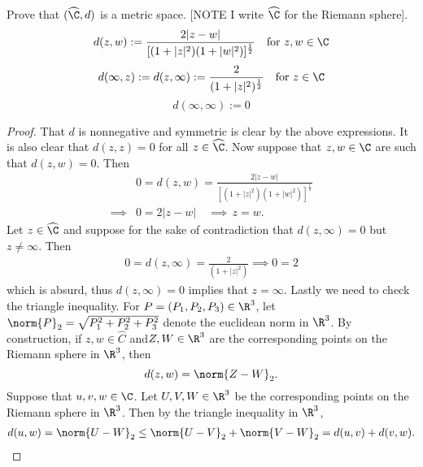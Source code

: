 \documentclass[12pt]{article}
\begin{document}
\begin{homeworkProblem}
Prove that $ (\widehat{\C},d) $ is a metric space. [NOTE I write $ \widehat{\C} $ for the Riemann sphere].\\

\[
  d(z,w) := \frac{2|z-w|}{[(1+|z|^{2})(1+|w|^{2})]^{\frac{1}{2}}}\quad \text{for }z,w\in\C
\]
\[
  d(\infty,z):= d(z,\infty) := \frac{2}{(1+|z|^{2})^{\frac{1}{2}}}\quad \text{for }z\in\C
\]
\[d(\infty,\infty):=0\]
\begin{proof}
 That $ d $ is nonnegative and symmetric is clear by the above expressions. It is also clear that $ d(z,z)= 0  $ for all $ z\in \widehat{\C} $. Now suppose that $ z,w\in \C $ are such that $ d(z,w)=0 $. Then 
 \begin{align*}
   &0 = d(z,w) = \frac{2|z-w|}{[(1+|z|^{2})(1+|w|^{2})]^{\frac{1}{2}}}  \\
   \implies& 0= 2|z-w|\quad \implies\,  z=w.
 \end{align*}
  Let $ z\in \widehat{\C} $ and suppose for the sake of contradiction that $ d(z,\infty)=0 $ but $ z \neq \infty $. Then
  \begin{align*}
    0=d(z,\infty) = \frac{2}{(1+|z|^{2})} \implies  0 = 2
  \end{align*}
  which is absurd, thus $ d(z,\infty)=0 $ implies that $ z=\infty $.
  Lastly we need to check the triangle inequality.  For $ P=(P_{1},P_{2},P_{3})\in\R^{3} $, let $ \norm{P}_{2}= \sqrt{P_{1}^{2}+P_{2}^{2}+P_{3}^{2}} $ denote the euclidean norm in $ \R^{3} $. By construction, if $ z,w\in \widehat{C} $ and$ Z,W\in\R^{3} $ are the corresponding points on the Riemann sphere in $ \R^{3} $, then 
  \[
    d(z,w) = \norm{Z-W}_{2}.
  \]
  Suppose that $ u,v,w\in\C $. Let $ U,V,W\in \R^{3}$ be the corresponding points on the Riemann sphere in $ \R^{3} $. Then by the triangle inequality in $ \R^{3} $,
  \begin{align*}
    d(u,w) = \norm{U-W}_{2} \leq \norm{U-V}_{2}+\norm{V-W}_{2} = d(u,v)+d(v,w).
  \end{align*}

\end{proof}

\end{homeworkProblem}
\end{document}
